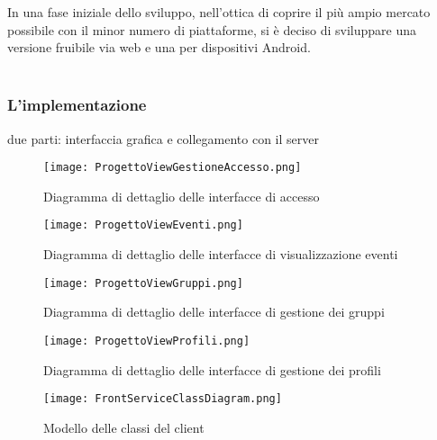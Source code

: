 In una fase iniziale dello sviluppo, nell'ottica di coprire il più ampio mercato possibile con il minor numero di piattaforme,
si è deciso di sviluppare una versione fruibile via web e una per dispositivi Android.\\
\\
\subsubsection{L'implementazione}

due parti: interfaccia grafica e collegamento con il server

\begin{figure}[h!]
    \begin{center}
        \texttt{[image: ProgettoViewGestioneAccesso.png]}
        \caption{Diagramma di dettaglio delle interfacce di accesso}
    \end{center}
\end{figure}

\begin{figure}[h!]
    \begin{center}
        \texttt{[image: ProgettoViewEventi.png]}
        \caption{Diagramma di dettaglio delle interfacce di visualizzazione eventi}
    \end{center}
\end{figure}

\begin{figure}[h!]
    \begin{center}
        \texttt{[image: ProgettoViewGruppi.png]}
        \caption{Diagramma di dettaglio delle interfacce di gestione dei gruppi}
    \end{center}
\end{figure}

\begin{figure}[h!]
    \begin{center}
        \texttt{[image: ProgettoViewProfili.png]}
        \caption{Diagramma di dettaglio delle interfacce di gestione dei profili}
    \end{center}
\end{figure}

\begin{figure}[h!]
    \begin{center}
        \texttt{[image: FrontServiceClassDiagram.png]}
        \caption{Modello delle classi del client}
    \end{center}
\end{figure}

